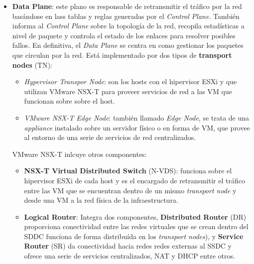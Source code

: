 \begin{itemize}
\begin{itemize}
        \item \textbf{Data Plane}: este plano es responsable de retransmitir el tráfico por la red basándose en lass tablas  y reglas generadas por el \textit{Control Plane}. También informa al \textit{Control Plane} sobre la topología de la red, recopila estadísticas a nivel de paquete y controla el estado de los enlaces para resolver posibles fallos. En definitiva, el \textit{Data Plane} se centra en como gestionar los paquetes que circulan por la red. Está implementado por dos tipos de \textbf{transport nodes} (TN):
        \begin{itemize}
            \item \textit{Hypervisor Transpor Node}: son los hosts con el hipervisor ESXi y que utilizan VMware NSX-T para proveer servicios de red a las VM que funcionan sobre sobre el host.
            \item \textit{VMware NSX-T Edge Node}: también llamado \textit{Edge Node}, se trata de una \textit{appliance} instalado sobre un servidor físico o en forma de VM, que provee al entorno de una serie de servicios de red centralizados.
        \end{itemize}
VMware NSX-T inlcuye otros componentes:
    \begin{itemize}
        \item \textbf{NSX-T Virtual Distributed Switch} (N-VDS): funciona sobre el hipervisor ESXi de cada host y es el encargado de retransmitir el tráfico entre las VM que se encuentran dentro de un mismo \textit{transport node} y desde una VM a la red física de la infraestructura.
        \item \textbf{Logical Router}: Integra dos componentes, \textbf{Distributed Router} (DR) proporciona conectividad entre las redes virtuales que se crean dentro del SDDC funciona de forma distribuída en los \textit{transport nodes}), y \textbf{Service Router} (SR) da conectividad hacia redes redes externas al SSDC y ofrece una serie de servicios centralizados, NAT y DHCP entre otros.

\end{itemize}
\end{itemize}
\end{itemize}
